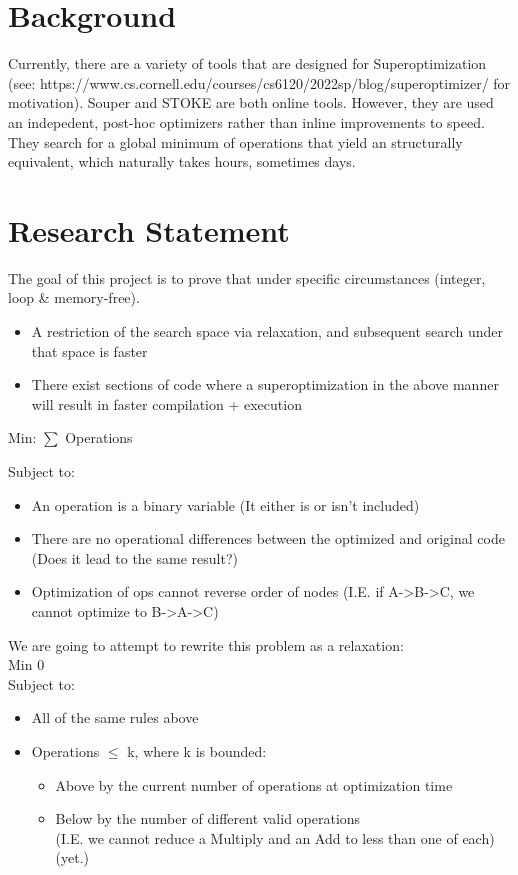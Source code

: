 
\section{Background}

Currently, there are a variety of tools that are designed for Superoptimization (see: https://www.cs.cornell.edu/courses/cs6120/2022sp/blog/superoptimizer/ for motivation). Souper and STOKE are both online tools. However, they are used an indepedent, post-hoc optimizers rather than inline improvements to speed. \\ They search for a global minimum of operations that yield an structurally equivalent, which naturally takes hours, sometimes days. 


\section{Research Statement} 

The goal of this project is to prove that under specific circumstances (integer, loop \& memory-free). 
\begin{itemize}
	\item A restriction of the search space via relaxation, and subsequent search under that space is faster
	\item There exist sections of code where a superoptimization in the above manner will result in faster compilation + execution
\end{itemize}

Min: $\sum$ Operations 

Subject to: 

\begin{itemize} 
	\item An operation is a binary variable (It either is or isn't included)
	\item There are no operational differences between the optimized and original code (Does it lead to the same result?)
	\item Optimization of ops cannot reverse order of nodes (I.E. if A->B->C, we cannot optimize to B->A->C)
\end{itemize}

We are going to attempt to rewrite this problem as a relaxation: \\

Min 0 
\\
Subject to: 
\begin{itemize}
	\item All of the same rules above
	\item Operations $\leq$ k, where k is bounded:
	\begin{itemize}
		\item Above by the current number of operations at optimization time
		\item Below by the number of different valid operations \\ 
		(I.E. we cannot reduce a Multiply and an Add to less than one of each) (yet.) \\
	\end{itemize}
\end{itemize}



